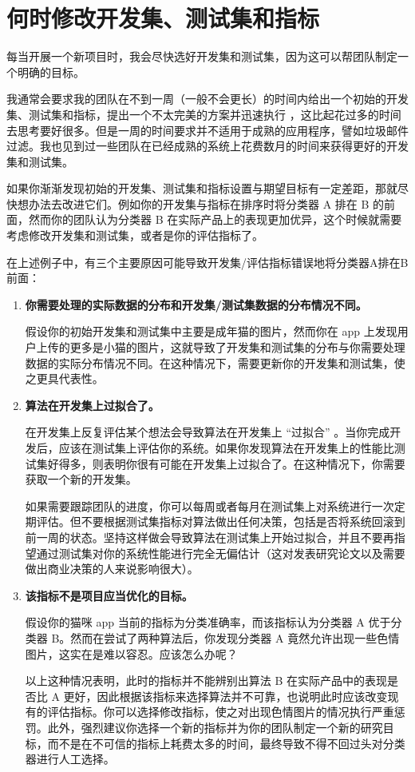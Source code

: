 \hypertarget{ux4f55ux65f6ux4feeux6539ux5f00ux53d1ux96c6ux6d4bux8bd5ux96c6ux548cux6307ux6807}{%
\chapter{何时修改开发集、测试集和指标}\label{ux4f55ux65f6ux4feeux6539ux5f00ux53d1ux96c6ux6d4bux8bd5ux96c6ux548cux6307ux6807}}

每当开展一个新项目时，我会尽快选好开发集和测试集，因为这可以帮团队制定一个明确的目标。

我通常会要求我的团队在不到一周（一般不会更长）的时间内给出一个初始的开发集、测试集和指标，提出一个不太完美的方案并迅速执行
，这比起花过多的时间去思考要好很多。但是一周的时间要求并不适用于成熟的应用程序，譬如垃圾邮件过滤。我也见到过一些团队在已经成熟的系统上花费数月的时间来获得更好的开发集和测试集。

如果你渐渐发现初始的开发集、测试集和指标设置与期望目标有一定差距，那就尽快想办法去改进它们。例如你的开发集与指标在排序时将分类器
A 排在 B 的前面，然而你的团队认为分类器 B
在实际产品上的表现更加优异，这个时候就需要考虑修改开发集和测试集，或者是你的评估指标了。

在上述例子中，有三个主要原因可能导致开发集/评估指标错误地将分类器A排在B前面：

\begin{enumerate}
\def\labelenumi{\arabic{enumi}.}
\item
  \textbf{你需要处理的实际数据的分布和开发集/测试集数据的分布情况不同。}

  假设你的初始开发集和测试集中主要是成年猫的图片，然而你在 app
  上发现用户上传的更多是小猫的图片，这就导致了开发集和测试集的分布与你需要处理数据的实际分布情况不同。在这种情况下，需要更新你的开发集和测试集，使之更具代表性。
\item
  \textbf{算法在开发集上过拟合了。}

  在开发集上反复评估某个想法会导致算法在开发集上 ``过拟合''
  。当你完成开发后，应该在测试集上评估你的系统。如果你发现算法在开发集上的性能比测试集好得多，则表明你很有可能在开发集上过拟合了。在这种情况下，你需要获取一个新的开发集。

  如果需要跟踪团队的进度，你可以每周或者每月在测试集上对系统进行一次定期评估。但不要根据测试集指标对算法做出任何决策，包括是否将系统回滚到前一周的状态。坚持这样做会导致算法在测试集上开始过拟合，并且不要再指望通过测试集对你的系统性能进行完全无偏估计（这对发表研究论文以及需要做出商业决策的人来说影响很大）。
\item
  \textbf{该指标不是项目应当优化的目标。}

  假设你的猫咪 app 当前的指标为分类准确率，而该指标认为分类器 A
  优于分类器 B。然而在尝试了两种算法后，你发现分类器 A
  竟然允许出现一些色情图片，这实在是难以容忍。应该怎么办呢？

  以上这种情况表明，此时的指标并不能辨别出算法 B
  在实际产品中的表现是否比 A
  更好，因此根据该指标来选择算法并不可靠，也说明此时应该改变现有的评估指标。你可以选择修改指标，使之对出现色情图片的情况执行严重惩罚。此外，强烈建议你选择一个新的指标并为你的团队制定一个新的研究目标，而不是在不可信的指标上耗费太多的时间，最终导致不得不回过头对分类器进行人工选择。
\end{enumerate}

